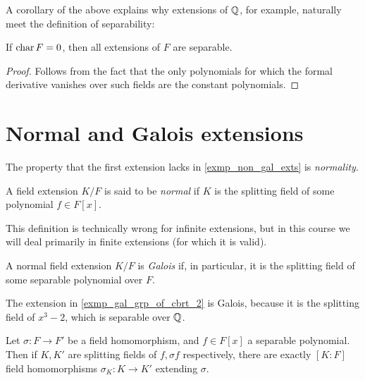 A corollary of the above explains why extensions of $\mathbb{{Q}}$, for example, naturally meet the definition of separability:

\begin{corollary}
    If $\operatorname{char}{{F}} = 0$, then all extensions of $F$ are separable.
\end{corollary}

\begin{proof}
    Follows from the fact that the only polynomials for which the formal derivative vanishes over such fields are the constant polynomials.
\end{proof}

\section{Normal and Galois extensions}

The property that the first extension lacks in \cref{exmp_non_gal_exts} is \emph{normality}.

\begin{definition}
    A field extension $K/F$ is said to be \emph{normal} if $K$ is the splitting field of some polynomial $f \in F[x]$.
\end{definition}

\begin{remark}
    This definition is technically wrong for infinite extensions, but in this course we will deal primarily in finite extensions (for which it is valid).
\end{remark}

\begin{definition}
    A normal field extension $K/F$ is \emph{Galois} if, in particular, it is the splitting field of some separable polynomial over $F$.
\end{definition}

\begin{example}
\label{exmp_gal_ext}
    The extension in \cref{exmp_gal_grp_of_cbrt_2} is Galois, because it is the splitting field of $x^3 - 2$, which is separable over $\mathbb{{Q}}$.
\end{example}

\begin{theorem}
    Let $\sigma: F \to F'$ be a field homomorphism, and $f \in F[x]$ a separable polynomial. Then if $K, K'$ are splitting fields of $f, \sigma f$ respectively, there are exactly $[K : F]$ field homomorphisms $\sigma_K: K \to K'$ extending $\sigma$.
\end{theorem}

